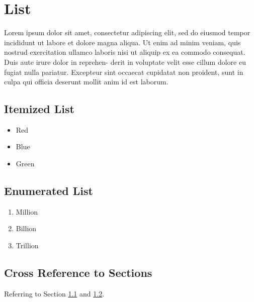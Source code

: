 

\chapter{List}
Lorem ipsum dolor sit amet, consectetur adipiscing elit, sed do eiusmod tempor incididunt
ut labore et dolore magna aliqua. Ut enim ad minim veniam, quis nostrud exercitation
ullamco laboris nisi ut aliquip ex ea commodo consequat. Duis aute irure dolor in reprehen-
derit in voluptate velit esse cillum dolore eu fugiat nulla pariatur. Excepteur sint occaecat
cupidatat non proident, sunt in culpa qui officia deserunt mollit anim id est laborum.

\section{Itemized List}\label{3.1}
\begin{itemize}
	\item Red
	\item Blue
	\item Green
\end{itemize}

\section{Enumerated List}\label{3.2}
\begin{enumerate}
    \item Million
    \item Billion
    \item Trillion
\end{enumerate}
\section{Cross Reference to Sections}
Referring to Section \ref{3.1} and \ref{3.2}.
